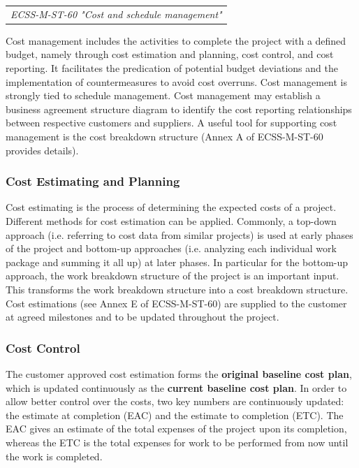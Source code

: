 \begin{tabular}{l}
\textit{ECSS-M-ST-60 "Cost and schedule management" \cite{ECSS-M-ST-60} }
\end{tabular}

Cost management includes the activities to complete the project with a defined budget, namely through cost estimation and planning, cost control, and cost reporting. It facilitates the predication of potential budget deviations and the implementation of countermeasures to avoid cost overruns. Cost management is strongly tied to schedule management. Cost management may establish a business agreement structure diagram to identify the cost reporting relationships between respective customers and suppliers. A useful tool for supporting cost management is the cost breakdown structure (Annex A of ECSS-M-ST-60 provides details).

\subsubsection{Cost Estimating and Planning}

Cost estimating is the process of determining the expected costs of a project. Different methods for cost estimation can be applied. Commonly, a top-down approach (i.e. referring to cost data from similar projects) is used at early phases of the project and bottom-up approaches (i.e. analyzing each individual work package and summing it all up) at later phases. In particular for the bottom-up approach, the work breakdown structure of the project is an important input. This transforms the work breakdown structure into a cost breakdown structure. Cost estimations (see Annex E of ECSS-M-ST-60) are supplied to the customer at agreed milestones and to be updated throughout the project.

\subsubsection{Cost Control}

The customer approved cost estimation forms the \textbf{original baseline cost plan}, which is updated continuously as the \textbf{current baseline cost plan}. In order to allow better control over the costs, two key numbers are continuously updated: the estimate at completion (EAC) and the estimate to completion (ETC). The EAC gives an estimate of the total expenses of the project upon its completion, whereas the ETC is the total expenses for work to be performed from now until the work is completed.

